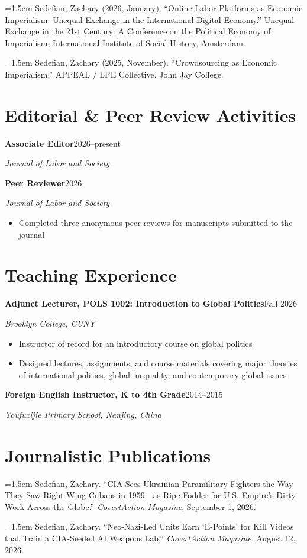 \documentclass[11pt,letterpaper]{article}
\newcommand{\entry}[3]{%
  \par{\bfseries #1}\hfill #2\par\nopagebreak
  {\itshape #3}\par\nopagebreak
}
\newcommand{\hang}[1]{%
  \par\hangindent=1.5em\hangafter=1 #1\par\vspace{5pt}%
}
\newcommand{\gap}{\par\vspace{7pt}}
\begin{document}
\hang{Sedefian, Zachary (2026, January). “Online Labor Platforms as Economic Imperialism: Unequal Exchange in the International Digital Economy.” Unequal Exchange in the 21st Century: A Conference on the Political Economy of Imperialism, International Institute of Social History, Amsterdam.}

\hang{Sedefian, Zachary (2025, November). “Crowdsourcing as Economic Imperialism.” APPEAL / LPE Collective, John Jay College.}

\section*{Editorial \& Peer Review Activities}

\entry{Associate Editor}{2026–present}{Journal of Labor and Society}
\gap
\entry{Peer Reviewer}{2026}{Journal of Labor and Society}
\begin{itemize}
  \item Completed three anonymous peer reviews for manuscripts submitted to the journal
\end{itemize}

\section*{Teaching Experience}

\entry{Adjunct Lecturer, POLS 1002: Introduction to Global Politics}{Fall 2026}{Brooklyn College, CUNY}
\begin{itemize}
  \item Instructor of record for an introductory course on global politics
  \item Designed lectures, assignments, and course materials covering major theories of international politics, global inequality, and contemporary global issues
\end{itemize}
\gap
\entry{Foreign English Instructor, K to 4th Grade}{2014–2015}{Youfuxijie Primary School, Nanjing, China}

\section*{Journalistic Publications}

\hang{Sedefian, Zachary. “CIA Sees Ukrainian Paramilitary Fighters the Way They Saw Right-Wing Cubans in 1959—as Ripe Fodder for U.S. Empire’s Dirty Work Across the Globe.” \textit{CovertAction Magazine}, September 1, 2026.}

\hang{Sedefian, Zachary. “Neo-Nazi-Led Units Earn ‘E-Points’ for Kill Videos that Train a CIA-Seeded AI Weapons Lab.” \textit{CovertAction Magazine}, August 12, 2026.}
\end{document}
